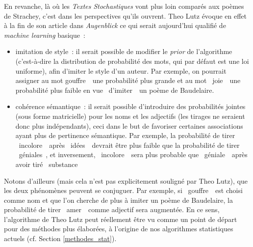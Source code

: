 \documentclass{article}
\begin{document}
				En revanche, là où les \textit{Textes Stochastiques} vont plus loin comparés aux poèmes de Strachey, c'est dans les perspectives qu'ils ouvrent. Theo Lutz évoque en effet à la fin de son article dans \textit{Augenblick} ce qui serait aujourd’hui qualifié de \textit{machine learning} basique :
				\vspace{2mm}
				\begin{itemize}
					\item imitation de style : il serait possible de modifier le \textit{prior} de l'algorithme (c'est-à-dire la distribution de probabilité des mots, qui par défaut est une loi uniforme), afin d'imiter le style d'un auteur. Par exemple, on pourrait assigner au mot gouffre~\guillemotright~une probabilité plus grande et au mot \guillemotleft~joie~\guillemotright~une probabilité plus faible en vue \guillemotleft~d'imiter~\guillemotright~un poème de Baudelaire.
					\item cohérence sémantique :  il serait possible d'introduire des probabilités jointes (sous forme matricielle) pour les noms et les adjectifs (les tirages ne seraient donc plus indépendants), ceci dans le but de favoriser certaines associations ayant plus de pertinence sémantique\footnotemark. Par exemple, la probabilité de tirer \guillemotleft~incolore~\guillemotright~après \guillemotleft~idées~\guillemotright~devrait être plus faible que la probabilité de tirer \guillemotleft~géniales~\guillemotright, et inversement, \guillemotleft~incolore~\guillemotright~sera plus probable que \guillemotleft~géniale~\guillemotright~après avoir tiré \guillemotleft~substance~\guillemotright~
				\end{itemize}
				\vspace{2mm}
				
				Notons d'ailleurs (mais cela n'est pas explicitement souligné par Theo Lutz), que les deux phénomènes peuvent se conjuguer. Par exemple, si \guillemotleft~gouffre~\guillemotright~est choisi comme nom et que l'on cherche de plus à imiter un poème de Baudelaire, la probabilité de tirer \guillemotleft~amer~\guillemotright~comme adjectif sera augmentée. En ce sens, l'algorithme de Theo Lutz peut réellement être vu comme un point de départ pour des méthodes plus élaborées, à l'origine de nos algorithmes statistiques actuels (cf. Section \ref{methodes_stat}).
\end{document}
